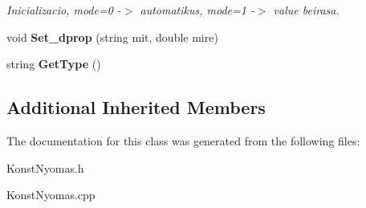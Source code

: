 \begin{DoxyCompactItemize}
\begin{DoxyCompactList}\small\item\em Inicializacio, mode=0 -\/$>$ automatikus, mode=1 -\/$>$ value beirasa. \end{DoxyCompactList}\item 
void {\bfseries Set\+\_\+dprop} (string mit, double mire)\hypertarget{class_konst_nyomas_aebe3ac3a8be035145dbc56429c8d2831}{}\label{class_konst_nyomas_aebe3ac3a8be035145dbc56429c8d2831}

\item 
string {\bfseries Get\+Type} ()\hypertarget{class_konst_nyomas_ac142568860665970fab5de0921758f2e}{}\label{class_konst_nyomas_ac142568860665970fab5de0921758f2e}

\end{DoxyCompactItemize}
\subsection*{Additional Inherited Members}


The documentation for this class was generated from the following files\+:\begin{DoxyCompactItemize}
\item 
Konst\+Nyomas.\+h\item 
Konst\+Nyomas.\+cpp\end{DoxyCompactItemize}
